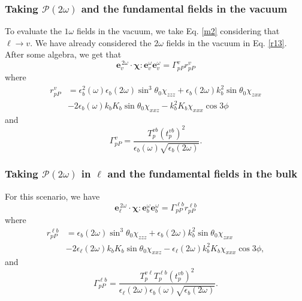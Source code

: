 \documentclass[aps,11pt]{revtex4}
\begin{document}
\subsubsection{Taking \texorpdfstring{$\mathcal{P}(2\omega)$}{P(2w)} and the
fundamental fields in the vacuum}

To evaluate the $1\omega$ fields in the vacuum, we take Eq. \eqref{m2}
considering that $\ell\rightarrow v$. We have already considered the $2\omega$
fields in the vacuum in Eq. \eqref{r13}. After some algebra, we get that
\begin{equation}
\mathbf{e}^{\,2\omega}_{v}\cdot
\boldsymbol{\chi}:\mathbf{e}^{\omega}_{v}\mathbf{e}^{\omega}_{v} =
\Gamma^{v}_{pP}r^{v}_{pP}
\end{equation}
where
\begin{equation}
\begin{split}
r^{v}_{pP} &=
    \epsilon^{2}_{b}(\omega)\epsilon_{b}(2\omega)
    \sin^{3}\theta_0\chi_{zzz}
 +  \epsilon_{b}(2\omega)k^{2}_{b}\sin\theta_0\chi_{zxx}\\
&- 2\epsilon_{b}(\omega)k_{b}K_{b}\sin\theta_0\chi_{xxz}
 -  k^{2}_{b}K_{b}\chi_{xxx}\cos3\phi
\end{split}
\end{equation}
and
\begin{equation}
\Gamma^{v}_{pP} =
\frac{T^{v b}_{p}\left(t^{v b}_{p}\right)^{2}}
     {\epsilon_{b}(\omega)\sqrt{\epsilon_{b}(2\omega)}}.
\end{equation}


\subsubsection{Taking \texorpdfstring{$\mathcal{P}(2\omega)$}{P(2w)} in
\texorpdfstring{$\ell$}{l} and the fundamental fields in the bulk}

For this scenario, we have
\begin{equation}
\mathbf{e}^{\,2\omega}_{\ell}\cdot
\boldsymbol{\chi}:\mathbf{e}^{\omega}_{b}\mathbf{e}^{\omega}_{b} =
\Gamma^{\ell b}_{pP}r^{\ell b}_{pP}
\end{equation}
where
\begin{equation}
\begin{split}
r^{\ell b}_{pP} &= 
  \epsilon_{b}(2\omega)\sin^{3}\theta_0\chi_{zzz}
+ \epsilon_{b}(2\omega)k^{2}_{b}\sin\theta_0\chi_{zxx}\\
&- 2\epsilon_{\ell}(2\omega)k_{b}K_{b}\sin\theta_0\chi_{xxz}
- \epsilon_{\ell}(2\omega)k^{2}_{b}K_{b}\chi_{xxx}\cos3\phi,
\end{split}
\end{equation}
and
\begin{equation}
\Gamma^{\ell b}_{pP}=
\frac{T^{v\ell}_{p}T^{\ell b}_{p}\left(t^{vb}_{p}\right)^{2}}
  {\epsilon_{\ell}({2\omega})\epsilon_{b}(\omega)\sqrt{\epsilon_{b}(2\omega)}}.
\end{equation}
\end{document}
